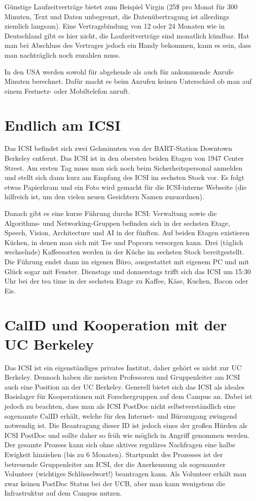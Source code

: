 \documentclass[a4paper]{scrreprt}
\begin{document}
Günstige Laufzeitverträge bietet zum Beispiel Virgin (25\$ pro Monat für 300 Minuten, Text und Daten unbegrenzt, die Datenübertragung ist allerdings ziemlich langsam). Eine Vertragsbindung von 12 oder 24 Monaten wie in Deutschland gibt es hier nicht, die Laufzeitverträge sind monatlich kündbar. Hat man bei Abschluss des Vertrages jedoch ein Handy bekommen, kann es sein, dass man nachträglich noch zuzahlen muss.

In den USA werden sowohl für abgehende als auch für ankommende Anrufe Minuten berechnet. Dafür macht es beim Anrufen keinen Unterschied ob man auf einem Festnetz- oder Mobiltelefon anruft.

\section{Endlich am ICSI}

Das ICSI befindet sich zwei Gehminuten von der BART-Station Downtown Berkeley entfernt. Das ICSI ist in den obersten beiden Etagen von 1947 Center Street. Am ersten Tag muss man sich noch beim Sicherheitspersonal anmelden und stellt sich dann kurz am Empfang des ICSI im sechsten Stock vor. Es folgt etwas Papierkram und ein Foto wird gemacht für die ICSI-interne Webseite (die hilfreich ist, um den vielen neuen Gesichtern Namen zuzuordnen).

Danach gibt es eine kurze Führung durchs ICSI: Verwaltung sowie die Algorithms- und Networking-Gruppen befinden sich in der sechsten Etage, Speech, Vision, Architecture und AI in der fünften. Auf beiden Etagen existieren Küchen, in denen man sich mit Tee und Popcorn versorgen kann. Drei (täglich wechselnde) Kaffeesorten werden in der Küche im sechsten Stock bereitgestellt. Die Führung endet dann im eigenen Büro, ausgestattet mit eigenem PC und mit Glück sogar mit Fenster. Dienstags und donnerstags trifft sich das ICSI um 15:30 Uhr bei der tea time in der sechsten Etage zu Kaffee, Käse, Kuchen, Bacon oder Eis.

\section{CalID und Kooperation mit der UC Berkeley}

Das ICSI ist ein eigenständiges privates Institut, daher gehört es nicht zur UC Berkeley. 
Dennoch haben die meisten Professoren und Gruppenleiter am ICSI auch eine Position an der UC Berkeley. 
Generell bietet sich das ICSI als ideales Basislager für Kooperationen mit Forschergruppen auf dem Campus an. 
Dabei ist jedoch zu beachten, dass man als ICSI PostDoc nicht selbstverständlich eine sogenannte CalID erhält, 
welche für den Internet- und Bürozugang zwingend notwendig ist. Die Beantragung dieser ID ist jedoch eines der großen Hürden als ICSI PostDoc und sollte daher so früh wie möglich in Angriff genommen werden. Der gesamte Prozess kann sich ohne aktives reguläres Nachfragen eine halbe Ewigkeit hinziehen (bis zu 6 Monaten). Startpunkt des Prozesses ist der betreuende Gruppenleiter am ICSI, der die Anerkennung als sogenannter Volunteer (wichtiges Schlüsselwort!) beantragen kann. Als Volunteer erhält man zwar keinen PostDoc Status bei der UCB, aber man kann wenigstens die Infrastruktur auf dem Campus nutzen. 
\end{document}
